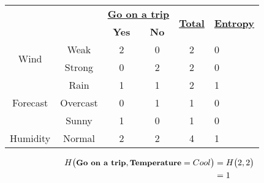 \documentclass[11pt]{article}
\begin{document}
\begin{enumerate}
\begin{table}[!ht]
	\centering
	\begin{tabular}{|c|c|c|c|c|l|}
		\hline
		\multicolumn{2}{|c|}{\multirow{2}{*}{\textbf{}}} & \multicolumn{2}{c|}{{\ul \textbf{Go on a trip}}} & \multirow{2}{*}{{\ul \textbf{Total}}} & \multirow{2}{*}{{\ul \textbf{Entropy}}} \\ \cline{3-4}
		\multicolumn{2}{|c|}{}                           & \textbf{Yes}            & \textbf{No}            &                                       &                                         \\ \hline
		\multirow{2}{*}{Wind}           & Weak           & 2                       & 0                      & 2                                     & 0                                       \\ \cline{2-6} 
		& Strong         & 0                       & 2                      & 2                                     & 0                                       \\ \hline
		\multirow{3}{*}{Forecast}       & Rain           & 1                       & 1                      & 2                                     & 1                                       \\ \cline{2-6} 
		& Overcast       & 0                       & 1                      & 1                                     & 0                                       \\ \cline{2-6} 
		& Sunny          & 1                       & 0                      & 1                                     & 0                                       \\ \hline
		Humidity                        & Normal         & 2                       & 2                      & 4                                     & 1                                      \\ \hline
	\end{tabular}
\end{table}
\begin{align*}
	H \big(\textbf{\small Go on a trip},\textbf{\small Temperature}=Cool\big) &= H \big(2,2\big) \\
										&= 1
\end{align*}


\end{enumerate}
\end{document}
